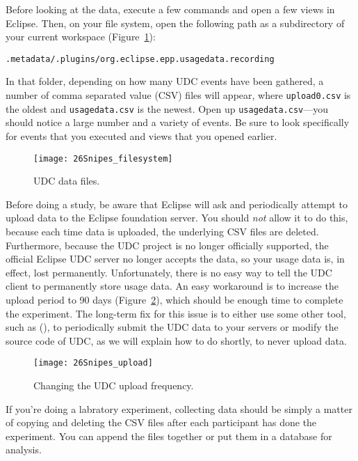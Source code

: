 Before looking at the data, execute a few commands and open a few views
in Eclipse.
Then, on your file system, open the following path as a subdirectory
of your current workspace (Figure~\ref{fig:filesystem}):

\begin{lstlisting}
.metadata/.plugins/org.eclipse.epp.usagedata.recording
\end{lstlisting}

\noindent
In that folder, depending on how many UDC events have been gathered,
a number of comma separated value (CSV) files will appear, where \texttt{upload0.csv} is the oldest
and \texttt{usagedata.csv} is the newest.
Open up \texttt{usagedata.csv}---you should notice a large number and a variety of events.
Be sure to look specifically for events that you executed and views that you opened earlier.

\begin{figure}
  \centering
  \texttt{[image: 26Snipes\_filesystem]}
  \caption{UDC data files.}\label{fig:filesystem}
\end{figure}

Before doing a study, be aware that Eclipse will ask and periodically attempt to upload
data to the Eclipse foundation server.
You should \emph{not} allow it to do this, because each time data is uploaded, the underlying
CSV files are deleted.
Furthermore, because the UDC project is no longer officially supported, the official Eclipse
UDC server no longer accepts the data, so your usage data is, in effect, lost permanently.
Unfortunately, there is no easy way to tell the UDC client to permanently store
usage data.
An easy workaround is to increase the upload period to 90 days (Figure~\ref{fig:upload}),
which should be enough time to complete the experiment.
The long-term fix for this issue is to either use some other tool, such as
\CodingSpectator{} (), to periodically submit the UDC
data to your servers or modify the source code of UDC, as we will explain how to
do shortly, to never upload data.

\begin{figure}
  \centering
  \texttt{[image: 26Snipes\_upload]}
  \caption{Changing the UDC upload frequency.}\label{fig:upload}
\end{figure}

If you're doing a labratory experiment, collecting data should be simply a matter of
copying and deleting the CSV files after each participant has done the experiment.
You can append the files together or put them in a database for analysis.


